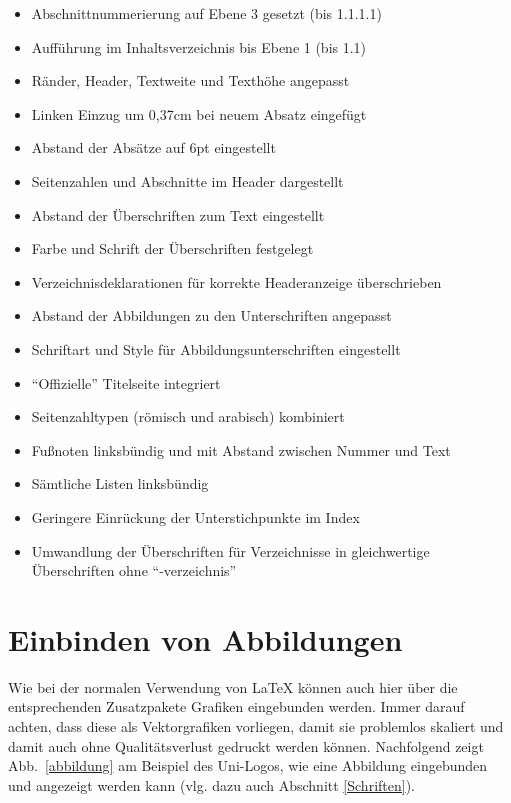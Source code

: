 \begin{itemize}
\item Abschnittnummerierung auf Ebene 3 gesetzt (bis 1.1.1.1)
\item Auff\"{u}hrung im Inhaltsverzeichnis bis Ebene 1 (bis 1.1)
\item R\"{a}nder, Header, Textweite und Texth\"{o}he angepasst
\item Linken Einzug um 0,37cm bei neuem Absatz eingef\"{u}gt
\item Abstand der Abs\"{a}tze auf 6pt eingestellt
\item Seitenzahlen und Abschnitte im Header dargestellt
\item Abstand der \"{U}berschriften zum Text eingestellt
\item Farbe und Schrift der \"{U}berschriften festgelegt
\item Verzeichnisdeklarationen f\"{u}r korrekte Headeranzeige
\"{u}berschrieben
\item Abstand der Abbildungen zu den Unterschriften angepasst
\item Schriftart und Style f\"{u}r Abbildungsunterschriften
eingestellt
\item "`Offizielle"' Titelseite integriert
\item Seitenzahltypen (r\"{o}misch und arabisch) kombiniert
\item Fu{\ss}noten linksb\"{u}ndig und mit Abstand zwischen Nummer und
Text
\item S\"{a}mtliche Listen linksb\"{u}ndig
\item Geringere Einr\"{u}ckung der Unterstichpunkte im Index
\item Umwandlung der \"{U}berschriften f\"{u}r Verzeichnisse in
gleichwertige \"{U}berschriften ohne "`-ver\-zeich\-nis"'
\end{itemize}


\section{Einbinden von Abbildungen}
Wie bei der normalen Verwendung von \LaTeX{} k\"{o}nnen auch hier \"{u}ber
die entsprechenden Zusatzpakete Grafiken eingebunden werden. Immer
darauf achten, dass diese als Vektorgrafiken vorliegen, damit sie
problemlos skaliert und damit auch ohne Qualit\"{a}tsverlust gedruckt
werden k\"{o}nnen. Nachfolgend zeigt Abb.~\ref{abbildung} am Beispiel
des Uni-Logos, wie eine Abbildung eingebunden und angezeigt werden
kann (vlg. dazu auch Abschnitt \ref{Schriften}).

